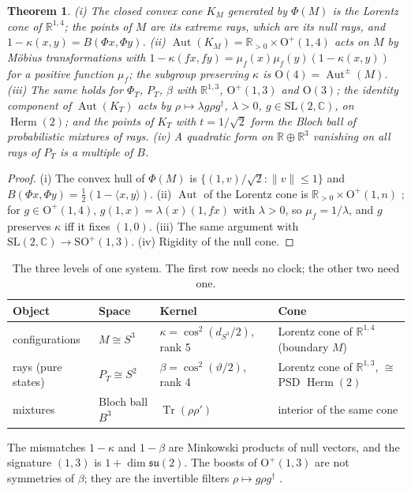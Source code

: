\documentclass[aps,pra,onecolumn,superscriptaddress,nofootinbib,10pt]{revtex4-2}
\newtheorem{theorem}{Theorem}
\theoremstyle{definition}
\theoremstyle{remark}
\newcommand{\R}{\mathbb{R}}
\newcommand{\C}{\mathbb{C}}
\newcommand{\su}{\mathfrak{su}}
\newcommand{\Aut}{\operatorname{Aut}}
\newcommand{\tr}{\operatorname{Tr}}
\newcommand{\Herm}{\operatorname{Herm}}
\newcommand{\ip}[2]{\langle #1,#2\rangle}
\newcommand{\SO}{\mathrm{SO}}
\newcommand{\OO}{\mathrm{O}}
\newcommand{\SL}{\mathrm{SL}}
\begin{document}
\begin{theorem}\label{thm:cone}
(i) The closed convex cone $K_M$ generated by $\Phi(M)$ is the Lorentz cone of $\R^{1,4}$; the points of
$M$ are its extreme rays, which are its null rays, and $1-\kappa(x,y)=B(\Phi x,\Phi y)$.
(ii) $\Aut(K_M)=\R_{>0}\times\OO^+(1,4)$ acts on $M$ by M\"obius transformations with
$1-\kappa(fx,fy)=\mu_f(x)\mu_f(y)(1-\kappa(x,y))$ for a positive function $\mu_f$; the subgroup
preserving $\kappa$ is $\OO(4)=\Aut^\pm(M)$.
(iii) The same holds for $\Phi_T$, $P_T$, $\beta$ with $\R^{1,3}$, $\OO^+(1,3)$ and $\OO(3)$; the identity
component of $\Aut(K_T)$ acts by $\rho\mapsto\lambda g\rho g^\dagger$, $\lambda>0$, $g\in\SL(2,\C)$, on $\Herm(2)$; and the
points of $K_T$ with $t=1/\sqrt2$ form the Bloch ball of probabilistic mixtures of rays.
(iv) A quadratic form on $\R\oplus\R^3$ vanishing on all rays of $P_T$ is a multiple of $B$.
\end{theorem}
\begin{proof}
(i) The convex hull of $\Phi(M)$ is $\{(1,v)/\sqrt2:\lVert v\rVert\le1\}$ and
$B(\Phi x,\Phi y)=\tfrac12(1-\ip{x}{y})$.  (ii) $\Aut$ of the Lorentz cone is $\R_{>0}\times\OO^+(1,n)$
\cite{FK}; for $g\in\OO^+(1,4)$, $g(1,x)=\lambda(x)(1,fx)$ with $\lambda>0$, so $\mu_f=1/\lambda$, and $g$
preserves $\kappa$ iff it fixes $(1,0)$.  (iii) The same argument with $\SL(2,\C)\to\SO^+(1,3)$.  (iv)
Rigidity of the null cone.
\end{proof}

\begin{table}[h]
\caption{The three levels of one system.  The first row needs no clock; the other two need one.}
\label{tab:levels}
\small
\begin{tabular}{@{}p{}p{}p{}p{}@{}}
\toprule
Object & Space & Kernel & Cone\\
\midrule
configurations & $M\cong S^3$ & $\kappa=\cos^2(d_{S^3}/2)$, rank 5 & Lorentz cone of $\R^{1,4}$ (boundary $M$)\\
rays (pure states) & $P_T\cong S^2$ & $\beta=\cos^2(\vartheta/2)$, rank 4 & Lorentz cone of $\R^{1,3}$, $\cong$ PSD $\Herm(2)$\\
mixtures & Bloch ball $B^3$ & $\tr(\rho\rho')$ & interior of the same cone\\
\bottomrule
\end{tabular}
\end{table}

The mismatches $1-\kappa$ and $1-\beta$ are Minkowski products of null vectors, and the signature
$(1,3)$ is $1+\dim\su(2)$.  The boosts of $\OO^+(1,3)$ are not symmetries of $\beta$; they are the
invertible filters $\rho\mapsto g\rho g^\dagger$ \cite{VDD}.
\end{document}
